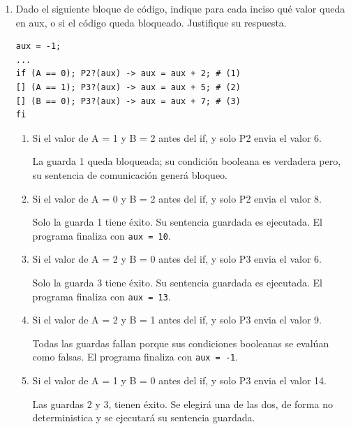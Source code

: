 \documentclass[a4paper, 10pt]{article}
\newenvironment{QandA}{
    \begin{enumerate}\bfseries}
    {\end{enumerate}
}
\newenvironment{answered}{\par\normalfont}{}
\begin{document}
\begin{QandA}
\begin{enumerate}
\begin{answered}
Es deseable que la granularidad de la aplicación, se ajuste a la de la arquitectura. Para hacer un uso apropiado de los recursos y evitar rendimientos menores.

En este escenario, el programa, \lstinline{P1} parece el más adecuado para ejecutar en la arquitectura planteada.
\end{answered}
\end{enumerate}


\item Dado el siguiente bloque de código, indique para cada inciso qué valor queda en aux, o si el código queda bloqueado. Justifique su respuesta.

\begin{lstlisting}
aux = -1;
...
if (A == 0); P2?(aux) -> aux = aux + 2; # (1)
[] (A == 1); P3?(aux) -> aux = aux + 5; # (2)
[] (B == 0); P3?(aux) -> aux = aux + 7; # (3)
fi
\end{lstlisting}
\begin{enumerate}
\item Si el valor de A = 1 y B = 2 antes del if, y solo P2 envia el valor 6.
\begin{answered}
La guarda 1 queda bloqueada; su condición booleana es verdadera pero, su sentencia de comunicación generá bloqueo.
\end{answered}
\item Si el valor de A = 0 y B = 2 antes del if, y solo P2 envia el valor 8.
\begin{answered}
Solo la guarda 1 tiene éxito. Su sentencia guardada es ejecutada. El programa finaliza con \lstinline{aux = 10}.
\end{answered}
\item Si el valor de A = 2 y B = 0 antes del if, y solo P3 envia el valor 6.
\begin{answered}
Solo la guarda 3 tiene éxito. Su sentencia guardada es ejecutada. El programa finaliza con \lstinline{aux = 13}.
\end{answered}
\item Si el valor de A = 2 y B = 1 antes del if, y solo P3 envia el valor 9.
\begin{answered}
Todas las guardas fallan porque sus condiciones booleanas se evalúan como falsas. El programa finaliza con \lstinline{aux = -1}.
\end{answered}
\item Si el valor de A = 1 y B = 0 antes del if, y solo P3 envia el valor 14.
\begin{answered}
Las guardas 2 y 3, tienen éxito. Se elegirá una de las dos, de forma no deterministica y se ejecutará su sentencia guardada.


\end{answered}
\end{enumerate}
\end{QandA}
\end{document}
